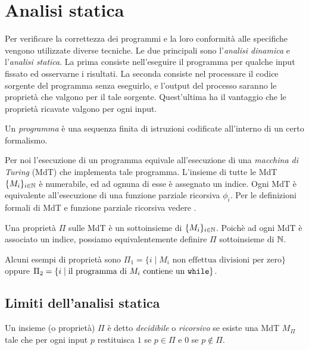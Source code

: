 \chapter{Analisi statica}

Per verificare la correttezza dei programmi e la loro conformità alle specifiche vengono utilizzate diverse tecniche. Le due principali sono l'\emph{analisi dinamica} e l'\emph{analisi statica}. La prima consiste nell'eseguire il programma per qualche input fissato ed osservarne i risultati. La seconda consiste nel processare il codice sorgente del programma senza eseguirlo, e l'output del processo saranno le proprietà che valgono per il tale sorgente. Quest'ultima ha il vantaggio che le proprietà ricavate valgono per ogni input. 

\begin{definition}[Programma]
Un \emph{programma} è una sequenza finita di istruzioni codificate all'interno di un certo formalismo.
\end{definition}

Per noi l'esecuzione di un programma equivale all'esecuzione di una \emph{macchina di Turing} (MdT) che implementa tale programma. L'insieme di tutte le MdT $\{ M_i \}_{i \in \mathbb{N}}$ è numerabile, ed ad ognuna di esse è assegnato un indice. Ogni MdT è equivalente all'esecuzione di una funzione parziale ricorsiva $\phi_i$. Per le definizioni formali di MdT e funzione parziale ricorsiva vedere \cite{calcolability}.

\begin{definition}[Proprietà]
Una proprietà $\Pi$ sulle MdT è un sottoinsieme di $\{ M_i \}_{i \in \mathbb{N}}$. Poichè ad ogni MdT è associato un indice, possiamo equivalentemente definire $\Pi$ sottoinsieme di $\mathbb{N}$.
\end{definition}

Alcuni esempi di proprietà sono $\Pi_1 = \{ i \mid M_i \text{ non effettua divisioni per zero} \}$ oppure $\Pi_2 = \{ i \mid \text{il programma di } M_i \text{ contiene un \texttt{while}} \}$.

\section{Limiti dell'analisi statica}

\begin{definition}[Decidibilità]
Un insieme (o proprietà) $\Pi$ è detto \emph{decidibile} o \emph{ricorsivo} se esiste una MdT $M_\Pi$ tale che per ogni input $p$ restituisca $1$ se $p \in \Pi$ e $0$ se $p \not\in\Pi$. 
\end{definition}


